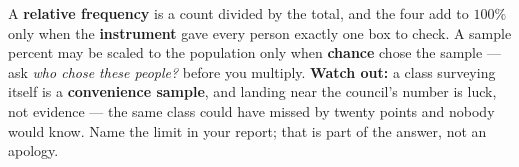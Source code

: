 \documentclass[12pt]{article}
\begin{document}
\vspace{0.14in}

\begin{remindbox}
\small
A \textbf{relative frequency} is a count divided by the total, and the four add to $100\%$
only when the \textbf{instrument} gave every person exactly one box to check. A sample percent
may be scaled to the population only when \textbf{chance} chose the sample --- ask \emph{who
chose these people?} before you multiply. \textbf{Watch out:} a class surveying itself is a
\textbf{convenience sample}, and landing near the council's number is luck, not evidence ---
the same class could have missed by twenty points and nobody would know. Name the limit in
your report; that is part of the answer, not an apology.
\end{remindbox}
\end{document}
